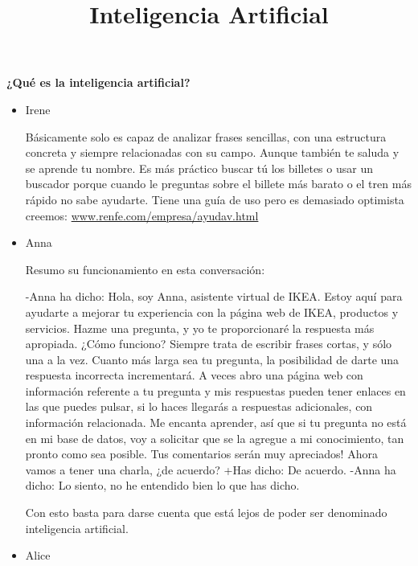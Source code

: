 \documentclass[spanish, a4paper, 12pt]{article} 	%
\begin{document}
\title{\textbf{Inteligencia Artificial}}
\maketitle



\newpage
\textbf{{¿Qué es la inteligencia artificial?}}


\begin{section}

	\begin{itemize}
	
	\item{Irene}
	
	Básicamente solo es capaz de analizar frases sencillas, con una estructura concreta y siempre relacionadas con su campo.
	 Aunque también te saluda y se aprende tu nombre. Es más práctico buscar tú los billetes o usar un buscador porque 
	 cuando le preguntas sobre el billete más barato o el tren más rápido no sabe ayudarte.
	 Tiene una guía de uso pero es demasiado optimista creemos: \url{www.renfe.com/empresa/ayudav.html}
	 
	\item{Anna}
	
	Resumo su funcionamiento en esta conversación:
	
	-Anna ha dicho: Hola, soy Anna, asistente virtual de IKEA. Estoy aquí para ayudarte a mejorar tu experiencia con la página 		web de IKEA, productos y servicios. Hazme una pregunta, y yo te proporcionaré la respuesta más apropiada. 
¿Cómo funciono? Siempre trata de escribir frases cortas, y sólo una a la vez. Cuanto más larga sea tu pregunta, la posibilidad de darte una respuesta incorrecta incrementará. A veces abro una página web con información referente a tu pregunta y mis respuestas pueden tener enlaces en las que puedes pulsar, si lo haces llegarás a respuestas adicionales, con información relacionada. Me encanta aprender, así que si tu pregunta no está en mi base de datos, voy a solicitar que se la agregue a mi conocimiento, tan pronto como sea posible. Tus comentarios serán muy apreciados! Ahora vamos a tener una charla, ¿de acuerdo?
	+Has dicho: De acuerdo.
	-Anna ha dicho: Lo siento, no he entendido bien lo que has dicho.
	
	Con esto basta para darse cuenta que está lejos de poder ser denominado inteligencia artificial.
		\item{Alice}
		

\end{itemize}
\end{section}
\end{document}
